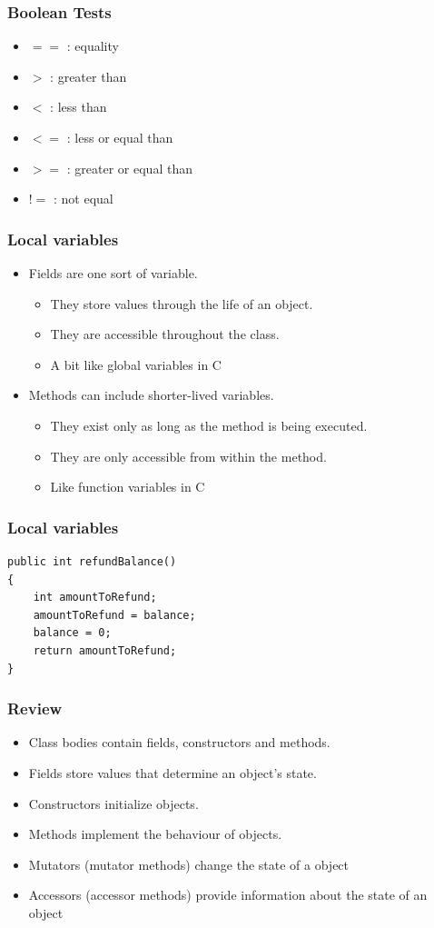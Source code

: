 \documentclass{beamer}
\begin{document}
\begin{frame}[fragile]
\frametitle{Boolean Tests}
\begin{itemize}
\item{$==$} : equality
\item{$>$} : greater than
\item{$<$} : less than
\item{$<=$} : less or equal than
\item{$>=$} : greater or equal than
\item{$!=$} : not equal
\end{itemize}
\end{frame}

\begin{frame}
\frametitle{Local variables}
\begin{itemize}
\item Fields are one sort of variable.
\begin{itemize}
\item They store values through the life of an object.
\item They are accessible throughout the class.
\item A bit like global variables in C
\end{itemize}
\item Methods can include shorter-lived variables.
\begin{itemize}
\item They exist only as long as the method is being executed.
\item They are only accessible from within the method.
\item Like function variables in C
\end{itemize}
\end{itemize}
\end{frame}

\begin{frame}[fragile]
\frametitle{Local variables}
\begin{lstlisting}
public int refundBalance()‏
{
    int amountToRefund;
    amountToRefund = balance;
    balance = 0;
    return amountToRefund;
} 
\end{lstlisting}
\end{frame}

\begin{frame}
\frametitle{Review}
\begin{itemize}
\item Class bodies contain fields, constructors and methods.
\item Fields store values that determine an object’s state.
\item Constructors initialize objects.
\item Methods implement the behaviour of objects.
\item Mutators (mutator methods) change the state of a object
\item Accessors (accessor methods) provide information about the state of an object 
\end{itemize}
\end{frame}
\end{document}
